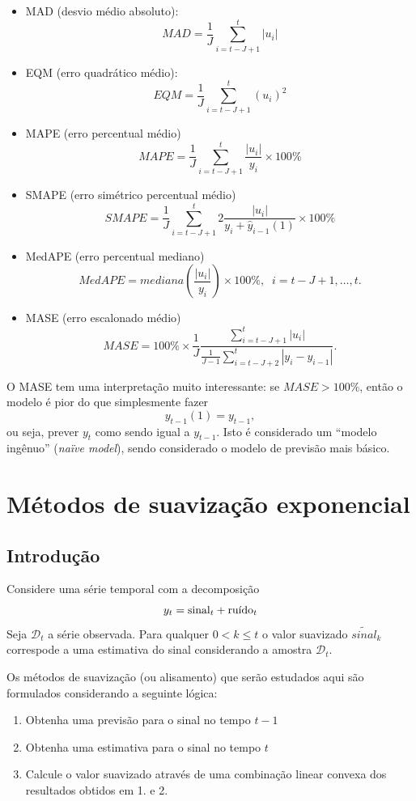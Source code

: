 \documentclass[
  letterpaper,
  DIV=11,
  numbers=noendperiod]{scrartcl}
\providecommand{\tightlist}{%
  \setlength{\itemsep}{0pt}\setlength{\parskip}{0pt}}
\theoremstyle{definition}
\theoremstyle{definition}
\theoremstyle{plain}
\theoremstyle{plain}
\theoremstyle{remark}
\begin{document}
\begin{itemize}
\tightlist
\item
  MAD (desvio médio absoluto):
  \[MAD = \frac{1}{J}\sum_{i=t-J+1}^t |u_i|\]
\item
  EQM (erro quadrático médio):
  \[EQM = \frac{1}{J}\sum_{i=t-J+1}^t (u_i)^2\]
\item
  MAPE (erro percentual médio)
  \[MAPE = \frac{1}{J}\sum_{i=t-J+1}^t \frac{|u_i|}{y_i}\times 100\%\]
\item
  SMAPE (erro simétrico percentual médio)
  \[SMAPE = \frac{1}{J}\sum_{i=t-J+1}^t 2\frac{|u_i|}{y_i+\hat{y}_{i-1}(1)}\times 100\%\]
\item
  MedAPE (erro percentual mediano)
  \[MedAPE = mediana\left(\frac{|u_i|}{y_i}\right) \times 100\%,\;\;i=t-J+1,\ldots,t.\]
\item
  MASE (erro escalonado médio)
  \[MASE = 100\%\times\frac{1}{J} \frac{\sum_{i = t-J+1}^t|u_i|}{\frac{1}{J-1}\sum_{i=t-J+2}^t |y_i - y_{i-1}|}.\]
\end{itemize}

O MASE tem uma interpretação muito interessante: se \(MASE>100\%\),
então o modelo é pior do que simplesmente fazer \[y_{t-1}(1)=y_{t-1},\]
ou seja, prever \(y_t\) como sendo igual a \(y_{t-1}\). Isto é
considerado um ``modelo ingênuo'' (\emph{naïve model}), sendo
considerado o modelo de previsão mais básico.


\chapter{Métodos de suavização
exponencial}\label{muxe9todos-de-suavizauxe7uxe3o-exponencial}

\section{Introdução}\label{introduuxe7uxe3o-1}

Considere uma série temporal com a decomposição
\[y_t=\hbox{sinal}_t+\hbox{ruído}_t\] Seja \(\mathcal{D}_t\) a série
observada. Para qualquer \(0<k\leq t\) o valor suavizado
\(\tilde{sinal}_k\) correspode a uma estimativa do sinal considerando a
amostra \(\mathcal{D}_t\).

Os métodos de suavização (ou alisamento) que serão estudados aqui são
formulados considerando a seguinte lógica:

\begin{enumerate}
\def\labelenumi{\arabic{enumi}.}
\tightlist
\item
  Obtenha uma previsão para o sinal no tempo \(t-1\)
\item
  Obtenha uma estimativa para o sinal no tempo \(t\)
\item
  Calcule o valor suavizado através de uma combinação linear convexa dos
  resultados obtidos em 1. e 2.
\end{enumerate}
\end{document}
